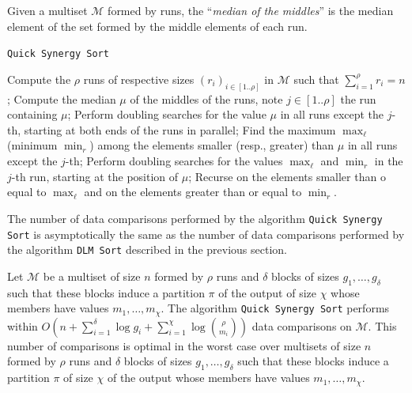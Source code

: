 \begin{definition}
  Given a multiset $\mathcal{M}$ formed by runs, the ``\emph{median of
    the middles}'' is the median element of the set formed by the
  middle elements of each run.
\end{definition}

\begin{algorithm} %
  \caption{\texttt{Quick Synergy Sort}} %
  \label{alg:qss} %
  \begin{algorithmic}[1] %

     

    \STATE Compute the $\rho$ runs of respective sizes
    $(r_i)_{i\in[1..\rho]}$ in $\mathcal{M}$ such that
    $\sum^{\rho}_{i=1} r_i = n$;
    \STATE Compute the median $\mu$ of
    the middles of the runs, note $j\in[1..\rho]$ the run containing
    $\mu$;
    \STATE Perform doubling searches for the value $\mu$ in all
    runs except the $j$-th, starting at both ends of the runs in
    parallel;
    \STATE Find the maximum $\max_\ell$ (minimum $\min_r$)
    among the elements smaller (resp., greater) than $\mu$ in all runs
    except the $j$-th;
    \STATE Perform doubling searches for the values
    $\max_\ell$ and $\min_r$ in the $j$-th run, starting at the
    position of $\mu$;
    \STATE Recurse on the elements smaller than o
    equal to $\max_\ell$ and on the elements greater than or equal to
    $\min_r$.
  \end{algorithmic}
\end{algorithm}

The number of data comparisons performed by the algorithm
\texttt{Quick Synergy Sort} is asymptotically the same as the number
of data comparisons performed by the algorithm \texttt{DLM Sort}
described in the previous section.

\begin{theorem}
  Let $\mathcal{M}$ be a multiset of size $n$ formed by $\rho$ runs
  and $\delta$ blocks of sizes $g_1, \dots, g_{\delta}$ such that
  these blocks induce a partition $\pi$ of the output of size $\chi$
  whose members have values $m_1, \dots, m_{\chi}$. The algorithm
  \texttt{Quick Synergy Sort} performs within
  $O(n + \sum^{\delta}_{i=1} \log g_i +
  \sum^{\chi}_{i=1}\log{\binom{\rho}{m_i}})$ data comparisons on
  $\mathcal{M}$. This number of comparisons is optimal in the worst
  case over multisets of size $n$ formed by $\rho$ runs and $\delta$
  blocks of sizes $g_1, \dots, g_{\delta}$ such that these blocks
  induce a partition $\pi$ of size $\chi$ of the output whose members
  have values $m_1, \dots, m_{\chi}$.
\end{theorem}

